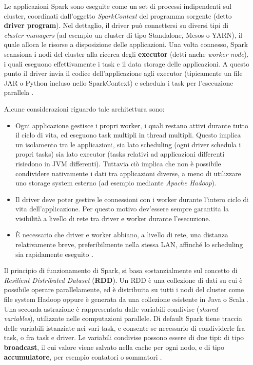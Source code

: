 \documentclass[12pt]{article}
\begin{document}
Le applicazioni Spark sono eseguite come un set di processi indipendenti sul cluster, coordinati dall'oggetto \textit{SparkContext} del programma sorgente (detto \textbf{driver program}). Nel dettaglio, il driver può connettersi su diversi tipi di \textit{cluster managers} (ad esempio un cluster di tipo Standalone, Mesos o YARN), il quale alloca le risorse a disposizione delle applicazioni. Una volta connesso, Spark scansiona i nodi del cluster alla ricerca degli \textbf{executor} (detti anche \textit{worker node}), i quali eseguono effettivamente i task e il data storage delle applicazioni. A questo punto il driver invia il codice dell'applicazione agli executor (tipicamente un file JAR o Python incluso nello SparkContext) e schedula i task per l'esecuzione parallela \cite{spark}. 

Alcune considerazioni riguardo tale architettura sono: 
\begin{itemize}
	\item Ogni applicazione gestisce i propri worker, i quali restano attivi durante tutto il ciclo di vita, ed eseguono task multipli in thread multipli. Questo implica un isolamento tra le applicazioni, sia lato scheduling (ogni driver schedula i propri tasks) sia lato executor (tasks relativi ad applicazioni differenti risiedono in JVM differenti). Tuttavia ciò implica che non è possibile condividere nativamente i dati tra applicazioni diverse, a meno di utilizzare uno storage system esterno (ad esempio mediante \textit{Apache Hadoop}).
	\item Il driver deve poter gestire le connessioni con i worker durante l'intero ciclo di vita dell'applicazione. Per questo motivo dev'essere sempre garantita la visibilità a livello di rete tra driver e worker durante l'esecuzione.
	\item \`E necessario che driver e worker abbiano, a livello di rete, una distanza relativamente breve, preferibilmente nella stessa LAN, affinché lo scheduling sia rapidamente eseguito \cite{spark}. 
\end{itemize}

Il principio di funzionamento di Spark, si basa sostanzialmente sul concetto di \textit{Resilient Distributed Dataset} (\textbf{RDD}). Un RDD è una collezione di dati su cui è possibile operare parallelamente, ed è distribuita su tutti i nodi del cluster come file system Hadoop oppure è generata da una collezione esistente in Java o Scala \cite{spark}. \\

Una seconda astrazione è rappresentata dalle variabili condivise (\textit{shared variables}), utilizzate nelle computazioni parallele. Di default Spark tiene traccia delle variabili istanziate nei vari task, e consente se necessario di condividerle fra task, o fra task e driver. Le variabili condivise possono essere di due tipi: di tipo \textbf{broadcast}, il cui valore viene salvato nella cache per ogni nodo, e di tipo \textbf{accumulatore}, per esempio contatori o sommatori \cite{spark}.
\end{document}
